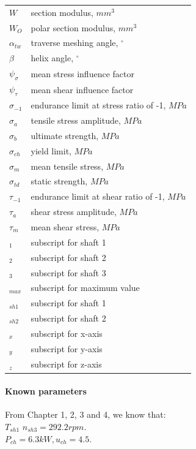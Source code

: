 \begin{tabular}[t]{p{}p{}}
	$ W $ & section modulus, $ \unit{mm^3} $\\
	$ W_O $ & polar section modulus, $ \unit{mm^3} $\\
	$ \alpha_{tw} $ & traverse meshing angle, $ ^\circ $\\
	$ \beta $ & helix angle, $ ^\circ $\\
	$ \psi_\sigma $ & mean stress influence factor\\
	$ \psi_\tau $ & mean shear influence factor\\
	$ \sigma_{-1} $ & endurance limit at stress ratio of -1, $ \unit{MPa} $\\
	$ \sigma_a $ & tensile stress amplitude, $ \unit{MPa} $\\
	$ \sigma_b $ & ultimate strength, $ \unit{MPa} $\\
	$ \sigma_{ch} $ & yield limit, $ \unit{MPa} $\\
	$ \sigma_m $ & mean tensile stress, $ \unit{MPa} $\\
	$ \sigma_{td} $ & static strength, $ \unit{MPa} $\\
	$ \tau_{-1} $ & endurance limit at shear ratio of -1, $ \unit{MPa} $\\
	$ \tau_a $ & shear stress amplitude, $ \unit{MPa} $\\
	$ \tau_m $ & mean shear stress, $ \unit{MPa} $\\
	$ _1 $ & subscript for shaft 1\\
	$ _2 $ & subscript for shaft 2\\
	$ _3 $ & subscript for shaft 3\\
	$ _{max} $ & subscript for maximum value\\
	$ _{sh1} $ & subscript for shaft 1\\
	$ _{sh2} $ & subscript for shaft 2\\
	$ _x $ & subscript for x-axis\\
	$ _y $ & subscript for y-axis\\
	$ _z $ & subscript for z-axis\\
\end{tabular}

\paragraph{Known parameters} From Chapter 1, 2, 3 and 4, we know that:\\
$ T_{sh1} $
$ n_{sh3}= 292.2\unit{rpm}$.\\
$ P_{ch}=6.3\unit{kW}, u_{ch}=4.5 $.

